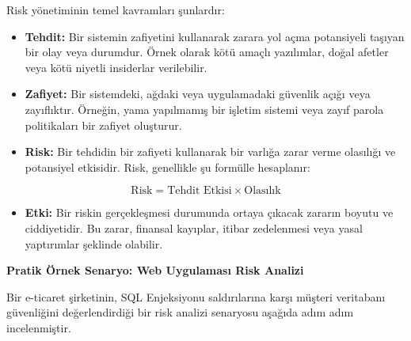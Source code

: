Risk yönetiminin temel kavramları şunlardır:

\begin{itemize}
    \item \textbf{Tehdit:} Bir sistemin zafiyetini kullanarak zarara yol açma potansiyeli taşıyan bir olay veya durumdur. Örnek olarak kötü amaçlı yazılımlar, doğal afetler veya kötü niyetli insiderlar verilebilir.
    \item \textbf{Zafiyet:} Bir sistemdeki, ağdaki veya uygulamadaki güvenlik açığı veya zayıflıktır. Örneğin, yama yapılmamış bir işletim sistemi veya zayıf parola politikaları bir zafiyet oluşturur.
    \item \textbf{Risk:} Bir tehdidin bir zafiyeti kullanarak bir varlığa zarar verme olasılığı ve potansiyel etkisidir. Risk, genellikle şu formülle hesaplanır:
\end{itemize}

$$\text{Risk} = \text{Tehdit Etkisi} \times \text{Olasılık}$$

\begin{itemize}
    \item \textbf{Etki:} Bir riskin gerçekleşmesi durumunda ortaya çıkacak zararın boyutu ve ciddiyetidir. Bu zarar, finansal kayıplar, itibar zedelenmesi veya yasal yaptırımlar şeklinde olabilir.
\end{itemize}

\textbf{Pratik Örnek Senaryo: Web Uygulaması Risk Analizi}

Bir e-ticaret şirketinin, SQL Enjeksiyonu saldırılarına karşı müşteri veritabanı güvenliğini değerlendirdiği bir risk analizi senaryosu aşağıda adım adım incelenmiştir.

